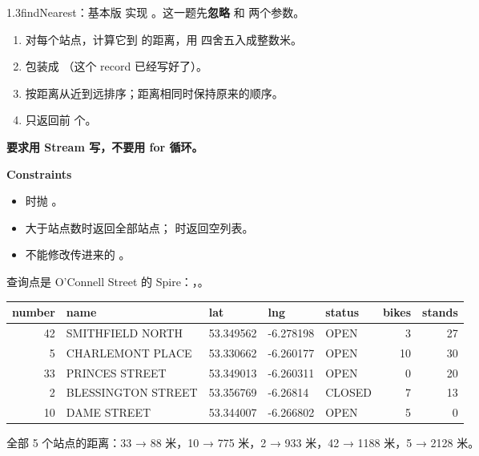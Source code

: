 \begin{task}{1.3\quad findNearest：基本版}
实现 。这一题先\textbf{忽略}  和  两个参数。

\begin{enumerate}
  \item 对每个站点，计算它到  的距离，用  四舍五入成整数米。
  \item 包装成 （这个 record 已经写好了）。
  \item 按距离从近到远排序；距离相同时保持原来的顺序。
  \item 只返回前  个。
\end{enumerate}

\textbf{要求用 Stream 写，不要用 for 循环。}

\textbf{Constraints}
\begin{itemize}
  \item {} 时抛 。
  \item {} 大于站点数时返回全部站点； 时返回空列表。
  \item 不能修改传进来的 。
\end{itemize}

\begin{example}
查询点是 O'Connell Street 的 Spire：，。

\medskip
{\small
\begin{tabular}{rllllrr}
\toprule
number & name & lat & lng & status & bikes & stands \\
\midrule
42 & SMITHFIELD NORTH & 53.349562 & -6.278198 & OPEN & 3 & 27 \\
5 & CHARLEMONT PLACE & 53.330662 & -6.260177 & OPEN & 10 & 30 \\
33 & PRINCES STREET & 53.349013 & -6.260311 & OPEN & 0 & 20 \\
2 & BLESSINGTON STREET & 53.356769 & -6.26814 & CLOSED & 7 & 13 \\
10 & DAME STREET & 53.344007 & -6.266802 & OPEN & 5 & 0 \\
\bottomrule
\end{tabular}}
\end{example}

\begin{example}
\begin{plaincode}
\end{plaincode}
全部 5 个站点的距离：33 → 88 米，10 → 775 米，2 → 933 米，42 → 1188 米，5 → 2128 米。
\end{example}
\end{task}

